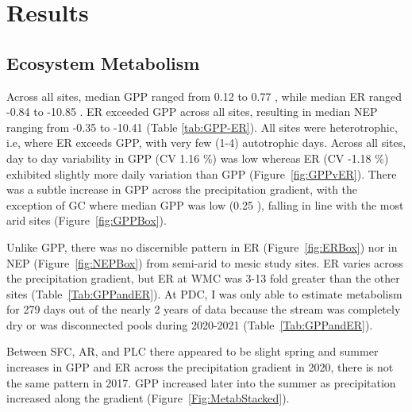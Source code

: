 %

\chapter[RESULTS]{Results}
\vspace{-12pt}
\section{Ecosystem Metabolism}

Across all sites, median GPP ranged from 0.12 to 0.77 \unit{\goxy}, while median ER ranged -0.84 to -10.85 \unit{\goxy}. ER exceeded GPP across all sites, resulting in median NEP ranging from -0.35 to -10.41 \unit{\goxy} (Table \ref{tab:GPP-ER}). All sites were heterotrophic, i.e, where ER exceeds GPP, with very few (1-4) autotrophic days. Across all sites, day to day variability in GPP (CV 1.16 \%) was low whereas ER (CV -1.18 \%) exhibited slightly more daily variation than GPP (Figure~\ref{fig:GPPvER}). There was a subtle increase in GPP across the precipitation gradient, with the exception of GC where median GPP was low (0.25 \unit{\goxy}), falling in line with the most arid sites (Figure~\ref{fig:GPPBox}). 

Unlike GPP, there was no discernible pattern in ER (Figure~\ref{fig:ERBox}) nor in NEP (Figure~\ref{fig:NEPBox}) from semi-arid to mesic study sites. ER varies across the precipitation gradient, but ER at WMC  was 3-13 fold greater than the other sites (Table~\ref{Tab:GPPandER}). At PDC, I was only able to estimate metabolism for 279 days out of the nearly 2 years of data because the stream was completely dry or was disconnected pools during 2020-2021 (Table~\ref{Tab:GPPandER}).


Between SFC, AR, and PLC there appeared to be slight spring and summer increases in GPP and ER across the precipitation gradient in 2020, there is not the same pattern in 2017. GPP increased later into the summer as precipitation increased along the gradient (Figure~\ref{Fig:MetabStacked}).

